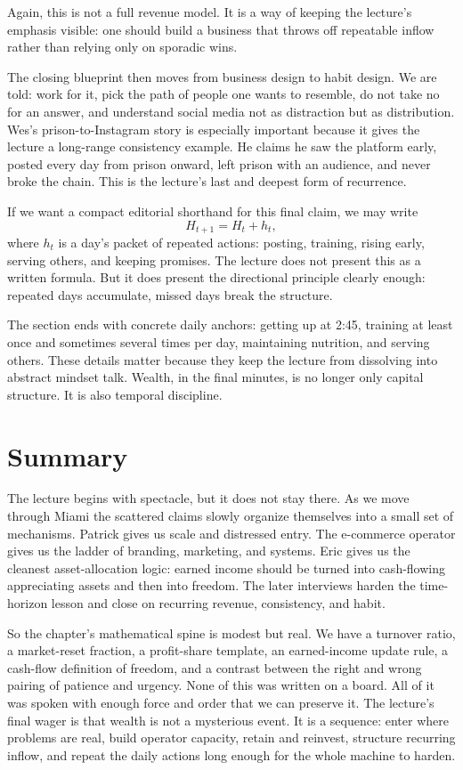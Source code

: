 Again, this is not a full revenue model. It is a way of keeping the lecture's emphasis visible: one should build a business that throws off repeatable inflow rather than relying only on sporadic wins.

The closing blueprint then moves from business design to habit design. We are told: work for it, pick the path of people one wants to resemble, do not take no for an answer, and understand social media not as distraction but as distribution. Wes's prison-to-Instagram story is especially important because it gives the lecture a long-range consistency example. He claims he saw the platform early, posted every day from prison onward, left prison with an audience, and never broke the chain. This is the lecture's last and deepest form of recurrence.

If we want a compact editorial shorthand for this final claim, we may write
\begin{equation}
H_{t+1} = H_t + h_t,
\end{equation}
where \(h_t\) is a day's packet of repeated actions: posting, training, rising early, serving others, and keeping promises. The lecture does not present this as a written formula. But it does present the directional principle clearly enough: repeated days accumulate, missed days break the structure.

The section ends with concrete daily anchors: getting up at 2:45, training at least once and sometimes several times per day, maintaining nutrition, and serving others. These details matter because they keep the lecture from dissolving into abstract mindset talk. Wealth, in the final minutes, is no longer only capital structure. It is also temporal discipline.

\section{Summary}

The lecture begins with spectacle, but it does not stay there. As we move through Miami the scattered claims slowly organize themselves into a small set of mechanisms. Patrick gives us scale and distressed entry. The e-commerce operator gives us the ladder of branding, marketing, and systems. Eric gives us the cleanest asset-allocation logic: earned income should be turned into cash-flowing appreciating assets and then into freedom. The later interviews harden the time-horizon lesson and close on recurring revenue, consistency, and habit.

So the chapter's mathematical spine is modest but real. We have a turnover ratio, a market-reset fraction, a profit-share template, an earned-income update rule, a cash-flow definition of freedom, and a contrast between the right and wrong pairing of patience and urgency. None of this was written on a board. All of it was spoken with enough force and order that we can preserve it. The lecture's final wager is that wealth is not a mysterious event. It is a sequence: enter where problems are real, build operator capacity, retain and reinvest, structure recurring inflow, and repeat the daily actions long enough for the whole machine to harden.